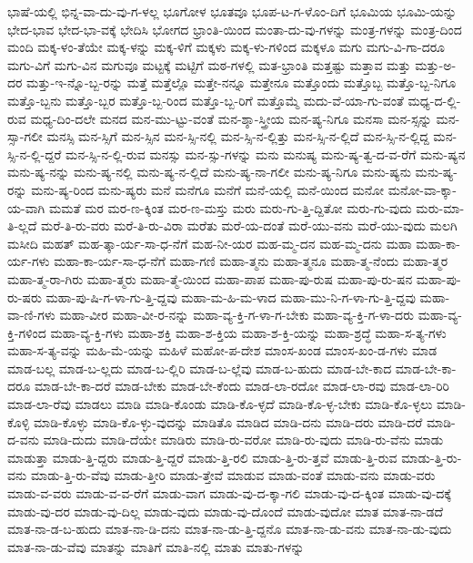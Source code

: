{ಭಾಷೆ-ಯಲ್ಲಿ
ಭಿನ್ನ-ವಾ-ದು-ವು-ಗ-ಳಲ್ಲ
ಭೂಗೋಳ
ಭೂತವೂ
ಭೂಪ-ಟ-ಗ-ಳೊಂ-ದಿಗೆ
ಭೂಮಿಯ
ಭೂಮಿ-ಯನ್ನು
ಭೇದ-ಭಾವ
ಭೇದ-ಭಾ-ವಕ್ಕೆ
ಭೇದಿಸಿ
ಭೋಗದ
ಭ್ರಾಂತಿ-ಯಿಂದ
ಮಂತಾ-ದು-ವು-ಗಳನ್ನು
ಮಂತ್ರ-ಗಳನ್ನು
ಮಂತ್ರ-ದಿಂದ
ಮಂದಿ
ಮಕ್ಕ-ಳಂ-ತೆಯೇ
ಮಕ್ಕ-ಳನ್ನು
ಮಕ್ಕ-ಳಿಗೆ
ಮಕ್ಕಳು
ಮಕ್ಕ-ಳು-ಗಳಿಂದ
ಮಕ್ಕಳೂ
ಮಗು
ಮಗು-ವಿ-ಗಾ-ದರೂ
ಮಗು-ವಿಗೆ
ಮಗು-ವಿನ
ಮಗುವೂ
ಮಟ್ಟಕ್ಕೆ
ಮಟ್ಟಿಗೆ
ಮಠ-ಗಳಲ್ಲಿ
ಮತ-ಭ್ರಾಂತಿ
ಮತ್ತಷ್ಟು
ಮತ್ತಾವ
ಮತ್ತು
ಮತ್ತು-ಅ-ದರ
ಮತ್ತು-ಇ-ನ್ನೊ-ಬ್ಬ-ರನ್ನು
ಮತ್ತೆ
ಮತ್ತೆಲ್ಲೊ
ಮತ್ತೇ-ನನ್ನೂ
ಮತ್ತೇನೂ
ಮತ್ತೊಂದು
ಮತ್ತೊಬ್ಬ
ಮತ್ತೊ-ಬ್ಬ-ನಿಗೂ
ಮತ್ತೊ-ಬ್ಬನು
ಮತ್ತೊ-ಬ್ಬರ
ಮತ್ತೊ-ಬ್ಬ-ರಿಂದ
ಮತ್ತೊ-ಬ್ಬ-ರಿಗೆ
ಮತ್ತೊಮ್ಮೆ
ಮದು-ವೆ-ಯಾ-ಗು-ವಂತೆ
ಮಧ್ಯ-ದ-ಲ್ಲಿ-ರುವ
ಮಧ್ಯ-ದಿಂ-ದಲೇ
ಮನದ
ಮನ-ಮು-ಟ್ಟು-ವಂತೆ
ಮನ-ಶ್ಶಾ-ಸ್ತ್ರೀಯ
ಮನ-ಷ್ಯ-ನಿಗೂ
ಮನಸಾ
ಮನ-ಸ್ಸನ್ನು
ಮನ-ಸ್ಸಾ-ಗಲೀ
ಮನಸ್ಸಿ
ಮನ-ಸ್ಸಿಗೆ
ಮನ-ಸ್ಸಿನ
ಮನ-ಸ್ಸಿ-ನಲ್ಲಿ
ಮನ-ಸ್ಸಿ-ನ-ಲ್ಲಿತ್ತು
ಮನ-ಸ್ಸಿ-ನ-ಲ್ಲಿದೆ
ಮನ-ಸ್ಸಿ-ನ-ಲ್ಲಿದ್ದ
ಮನ-ಸ್ಸಿ-ನ-ಲ್ಲಿ-ದ್ದರೆ
ಮನ-ಸ್ಸಿ-ನ-ಲ್ಲಿ-ರುವ
ಮನಸ್ಸು
ಮನ-ಸ್ಸು-ಗಳನ್ನು
ಮನು
ಮನುಷ್ಯ
ಮನು-ಷ್ಯ-ತ್ವ-ದ-ವ-ರೆಗೆ
ಮನು-ಷ್ಯನ
ಮನು-ಷ್ಯ-ನನ್ನು
ಮನು-ಷ್ಯ-ನಲ್ಲಿ
ಮನು-ಷ್ಯ-ನ-ಲ್ಲಿದೆ
ಮನು-ಷ್ಯ-ನಾ-ಗಲೀ
ಮನು-ಷ್ಯ-ನಿಗೂ
ಮನು-ಷ್ಯನು
ಮನು-ಷ್ಯ-ರನ್ನು
ಮನು-ಷ್ಯ-ರಿಂದ
ಮನು-ಷ್ಯರು
ಮನೆ
ಮನೆಗೂ
ಮನೆಗೆ
ಮನೆ-ಯಲ್ಲಿ
ಮನೆ-ಯಿಂದ
ಮನೋ
ಮನೋ-ವಾ-ಕ್ಕಾ-ಯ-ವಾಗಿ
ಮಮತೆ
ಮರ
ಮರ-ಣ-ಕ್ಕಿಂತ
ಮರ-ಣ-ಮಸ್ತು
ಮರು
ಮರು-ಗು-ತ್ತಿ-ದ್ದಿತೋ
ಮರು-ಗು-ವುದು
ಮರು-ಮಾ-ತಿ-ಲ್ಲದೆ
ಮರೆ-ತಿ-ರು-ವರು
ಮರೆ-ತಿ-ರು-ವಿರಾ
ಮರೆತು
ಮರೆ-ಯ-ದಂತೆ
ಮರೆ-ಯು-ವನು
ಮರೆ-ಯು-ವುದು
ಮಲಗಿ
ಮಸೀದಿ
ಮಹತ್
ಮಹ-ತ್ಕಾ-ರ್ಯ-ಸಾ-ಧ-ನೆಗೆ
ಮಹ-ನೀ-ಯರ
ಮಹ-ಮ್ಮ-ದನ
ಮಹ-ಮ್ಮ-ದನು
ಮಹಾ
ಮಹಾ-ಕಾ-ರ್ಯ-ಗಳು
ಮಹಾ-ಕಾ-ರ್ಯ-ಸಾ-ಧ-ನೆಗೆ
ಮಹಾ-ಗಣಿ
ಮಹಾ-ತ್ಮನು
ಮಹಾ-ತ್ಮನೂ
ಮಹಾ-ತ್ಮ-ನೆಂದು
ಮಹಾ-ತ್ಮರ
ಮಹಾ-ತ್ಮ-ರಾ-ಗಿರು
ಮಹಾ-ತ್ಮರು
ಮಹಾ-ತ್ಮೆ-ಯಿಂದ
ಮಹಾ-ಪಾಪ
ಮಹಾ-ಪು-ರುಷ
ಮಹಾ-ಪು-ರು-ಷನ
ಮಹಾ-ಪು-ರು-ಷರು
ಮಹಾ-ಪು-ಷಿ-ಗ-ಳಾ-ಗು-ತ್ತಿ-ದ್ದವು
ಮಹಾ-ಮ-ಹಿ-ಮ-ಳಾದ
ಮಹಾ-ಮು-ನಿ-ಗ-ಳಾ-ಗು-ತ್ತಿ-ದ್ದವು
ಮಹಾ-ವಾ-ಣಿ-ಗಳು
ಮಹಾ-ವೀರ
ಮಹಾ-ವೀ-ರ-ನನ್ನು
ಮಹಾ-ವ್ಯ-ಕ್ತಿ-ಗ-ಳಾ-ಗ-ಬೇಕು
ಮಹಾ-ವ್ಯ-ಕ್ತಿ-ಗ-ಳಾ-ದರು
ಮಹಾ-ವ್ಯ-ಕ್ತಿ-ಗಳಿಂದ
ಮಹಾ-ವ್ಯ-ಕ್ತಿ-ಗಳು
ಮಹಾ-ಶಕ್ತಿ
ಮಹಾ-ಶ-ಕ್ತಿಯ
ಮಹಾ-ಶ-ಕ್ತಿ-ಯನ್ನು
ಮಹಾ-ಶ್ರದ್ಧೆ
ಮಹಾ-ಸ-ತ್ಯ-ಗಳು
ಮಹಾ-ಸ-ತ್ಯ-ವನ್ನು
ಮಹಿ-ಮೆ-ಯನ್ನು
ಮಹಿಳೆ
ಮಹೋ-ಪ-ದೇಶ
ಮಾಂಸ-ಖಂಡ
ಮಾಂಸ-ಖಂ-ಡ-ಗಳು
ಮಾಡ
ಮಾಡ-ಬಲ್ಲ
ಮಾಡ-ಬ-ಲ್ಲದು
ಮಾಡ-ಬ-ಲ್ಲಿರಿ
ಮಾಡ-ಬ-ಲ್ಲೆವು
ಮಾಡ-ಬ-ಹುದು
ಮಾಡ-ಬೇ-ಕಾದ
ಮಾಡ-ಬೇ-ಕಾ-ದರೂ
ಮಾಡ-ಬೇ-ಕಾ-ದರೆ
ಮಾಡ-ಬೇಕು
ಮಾಡ-ಬೇ-ಕೆಂದು
ಮಾಡ-ಲಾ-ರದೋ
ಮಾಡ-ಲಾ-ರವು
ಮಾಡ-ಲಾ-ರಿರಿ
ಮಾಡ-ಲಾ-ರೆವು
ಮಾಡಲು
ಮಾಡಿ
ಮಾಡಿ-ಕೊಂಡು
ಮಾಡಿ-ಕೊ-ಳ್ಳದೆ
ಮಾಡಿ-ಕೊ-ಳ್ಳ-ಬೇಕು
ಮಾಡಿ-ಕೊ-ಳ್ಳಲು
ಮಾಡಿ-ಕೊಳ್ಳಿ
ಮಾಡಿ-ಕೊಳ್ಳು
ಮಾಡಿ-ಕೊ-ಳ್ಳು-ವುದನ್ನು
ಮಾಡಿತೊ
ಮಾಡಿದ
ಮಾಡಿ-ದನು
ಮಾಡಿ-ದರು
ಮಾಡಿ-ದರೆ
ಮಾಡಿ-ದ-ವನು
ಮಾಡಿ-ದುದು
ಮಾಡಿ-ದೆಯೇ
ಮಾಡಿರು
ಮಾಡಿ-ರು-ವರೋ
ಮಾಡಿ-ರು-ವುದು
ಮಾಡಿ-ರು-ವೆನು
ಮಾಡು
ಮಾಡುತ್ತಾ
ಮಾಡು-ತ್ತಿ-ದ್ದರು
ಮಾಡು-ತ್ತಿ-ದ್ದರೆ
ಮಾಡು-ತ್ತಿ-ರಲಿ
ಮಾಡು-ತ್ತಿ-ರು-ತ್ತವೆ
ಮಾಡು-ತ್ತಿ-ರುವ
ಮಾಡು-ತ್ತಿ-ರು-ವನು
ಮಾಡು-ತ್ತಿ-ರು-ವೆವು
ಮಾಡು-ತ್ತೀರಿ
ಮಾಡು-ತ್ತೇವೆ
ಮಾಡುವ
ಮಾಡು-ವಂತೆ
ಮಾಡು-ವನು
ಮಾಡು-ವರು
ಮಾಡು-ವ-ವರು
ಮಾಡು-ವ-ವ-ರೆಗೆ
ಮಾಡು-ವಾಗ
ಮಾಡು-ವು-ದ-ಕ್ಕಾ-ಗಲಿ
ಮಾಡು-ವು-ದ-ಕ್ಕಿಂತ
ಮಾಡು-ವು-ದಕ್ಕೆ
ಮಾಡು-ವು-ದರ
ಮಾಡು-ವು-ದಿಲ್ಲ
ಮಾಡು-ವುದು
ಮಾಡು-ವು-ದೊಂದೆ
ಮಾಡು-ವುದೋ
ಮಾತ
ಮಾತ-ನಾ-ಡದೆ
ಮಾತ-ನಾ-ಡ-ಬ-ಹುದು
ಮಾತ-ನಾ-ಡಿ-ದನು
ಮಾತ-ನಾ-ಡು-ತ್ತಿ-ದ್ದನೊ
ಮಾತ-ನಾ-ಡು-ವನು
ಮಾತ-ನಾ-ಡು-ವುದು
ಮಾತ-ನಾ-ಡು-ವೆವು
ಮಾತನ್ನು
ಮಾತಿಗೆ
ಮಾತಿ-ನಲ್ಲಿ
ಮಾತು
ಮಾತು-ಗಳನ್ನು
}
